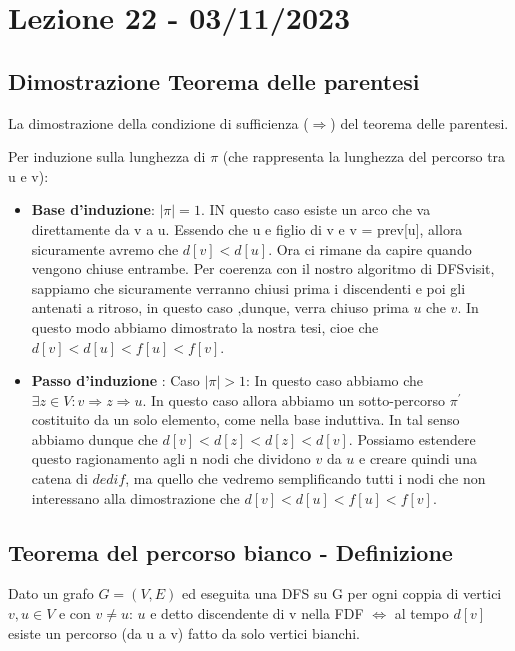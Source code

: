 \section{Lezione 22 - 03/11/2023}

\subsection{Dimostrazione Teorema delle parentesi}

La dimostrazione della condizione di sufficienza ($\Rightarrow$) del teorema delle parentesi.

Per induzione sulla lunghezza di $\pi$ (che rappresenta la lunghezza del percorso tra u e v):

\begin{itemize}
	\item \textbf{Base d'induzione}: $|\pi| = 1$. IN questo caso esiste un arco che va direttamente da v a u. Essendo che u e figlio di v e v = prev[u], allora sicuramente avremo che $d[v] < d[u]$. Ora ci rimane da capire quando vengono chiuse entrambe. Per coerenza con il nostro algoritmo di DFSvisit, sappiamo che sicuramente verranno chiusi prima i discendenti e poi gli antenati a ritroso, in questo caso ,dunque, verra chiuso prima $u$ che $v$.
	In questo modo abbiamo dimostrato la nostra tesi, cioe che $d[v] < d[u] < f[u] < f[v]$.
	\item \textbf{Passo d'induzione} : Caso $|\pi| > 1$:
	In questo caso abbiamo che $\exists z \in V: v\Rightarrow z \Rightarrow u$. In questo caso allora abbiamo un sotto-percorso $\pi^{\prime}$ costituito da un solo elemento, come nella base induttiva. In tal senso abbiamo dunque che $d[v] < d[z] < d[z] < d[v]$.
	Possiamo estendere questo ragionamento agli n nodi che dividono $v$ da $u$ e creare quindi una catena di $d e di f$, ma quello che vedremo semplificando tutti i nodi che non interessano alla dimostrazione che $d[v] < d[u] < f[u] < f[v]$.
\end{itemize}





\subsection{Teorema del percorso bianco - Definizione}

Dato un grafo $G = (V,E)$ ed eseguita una DFS su G per ogni coppia di vertici $v,u \in V$ e con $v \neq u$: \newline
$u$ e detto discendente di v nella FDF $ \iff $ al tempo $d[v]$ esiste un percorso (da u a v) fatto da solo vertici bianchi.

